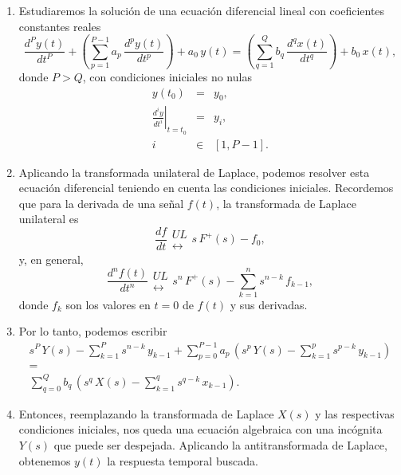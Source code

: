 \begin{enumerate}

\item Estudiaremos la soluci\'{o}n de una ecuaci\'{o}n diferencial lineal con coeficientes constantes reales
\begin{equation}
	\frac{d^{P}y\left( t\right) }{dt^{P}} +
	\left(\sum_{p=1}^{P-1}a_{p} \, \frac{d^{p}y\left( t\right) }{dt^{p}}\right) + a_{0} \, y(t)= 
	\left(\sum_{q=1}^{Q}b_{q} \, \frac{d^{q}x\left( t\right) }{dt^{q}}\right)  + b_{0} \, x(t),
\end{equation}
donde $P > Q$, con condiciones iniciales no nulas
\begin{eqnarray}
  y(t_{0}) &=& y_{0}, \\
  \left. \frac{d^{i}y}{dt^{i}} \right|_{t=t_{0}} &=& y_{i},\\
  i &\in& [1,P-1].
\end{eqnarray}

\item Aplicando la transformada unilateral de Laplace, podemos resolver esta ecuaci\'{o}n diferencial 
teniendo en cuenta las condiciones iniciales. Recordemos que para la derivada de una se\~{n}al $f(t)$, la 
transformada de Laplace unilateral es
\begin{equation}
  \frac{df}{dt} \begin{array}{c} UL \\ \leftrightarrow \end{array} s \, F^{+}(s) - f_{0},
\end{equation}
y, en general,
\begin{equation}
  \frac{d^{n}f(t)}{dt^{n}} \begin{array}{c} UL \\ \leftrightarrow \end{array}
  s^{n} \, F^{+}(s) - \sum_{k=1}^{n} s^{n-k} \, f_{k-1},
\end{equation}
donde $f_{k}$ son los valores en $t = 0$ de $f(t)$ y sus derivadas.

\item Por lo tanto, podemos escribir
\begin{equation}
	\begin{array}{c}
   s^P \, Y(s) - \sum_{k=1}^{P} s^{n-k} \, y_{k-1} +
   \sum_{p=0}^{P-1}a_{p} \, \left(s^{p} \, Y(s) - \sum_{k=1}^{p} s^{p-k} \, y_{k-1}\right) \\ = \\
     \sum_{q=0}^{Q}b_{q} \, \left(s^{q} \, X(s) - \sum_{k=1}^{q} s^{q-k} \, x_{k-1}\right).
     \end{array}
\end{equation}

\item Entonces, reemplazando la transformada de Laplace $X(s)$ y las respectivas condiciones iniciales, nos queda una ecuación algebraica con una incógnita $Y(s)$ que puede ser despejada. Aplicando la antitransformada de Laplace, obtenemos $y(t)$ la respuesta temporal buscada.
\end{enumerate}

